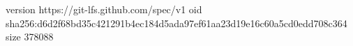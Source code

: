 version https://git-lfs.github.com/spec/v1
oid sha256:d6d2f68bd35c421291b4ec184d5ada97ef61aa23d19e16c60a5cd0edd708c364
size 378088
